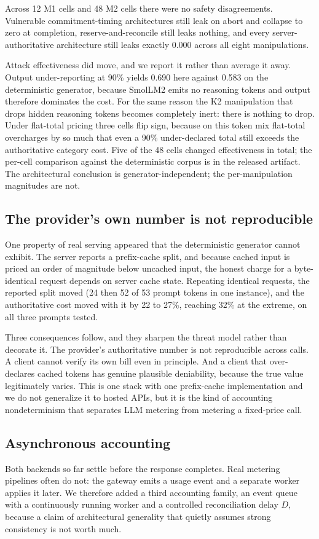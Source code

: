 \documentclass[preprint,3p,authoryear,12pt]{elsarticle}
\begin{document}
Across 12 M1 cells and 48 M2 cells there were no safety disagreements. Vulnerable
commitment-timing architectures still leak on abort and collapse to zero at completion,
reserve-and-reconcile still leaks nothing, and every server-authoritative architecture
still leaks exactly 0.000 across all eight manipulations.

Attack effectiveness did move, and we report it rather than average it away. Output
under-reporting at 90\% yields 0.690 here against 0.583 on the deterministic generator,
because SmolLM2 emits no reasoning tokens and output therefore dominates the cost. For
the same reason the K2 manipulation that drops hidden reasoning tokens becomes completely
inert: there is nothing to drop. Under flat-total pricing three cells flip sign, because
on this token mix flat-total overcharges by so much that even a 90\% under-declared total
still exceeds the authoritative category cost. Five of the 48 cells changed effectiveness
in total; the per-cell comparison against the deterministic corpus is in the released
artifact. The architectural conclusion is generator-independent; the per-manipulation
magnitudes are not.

\subsection{The provider's own number is not reproducible}
One property of real serving appeared that the deterministic generator cannot exhibit.
The server reports a prefix-cache split, and because cached input is priced an order of
magnitude below uncached input, the honest charge for a byte-identical request depends on
server cache state. Repeating identical requests, the reported split moved (24 then 52
of 53 prompt tokens in one instance), and the authoritative cost moved with it by 22 to
27\%, reaching 32\% at the extreme, on all three prompts tested.

Three consequences follow, and they sharpen the threat model rather than decorate it.
The provider's authoritative number is not reproducible across calls. A client cannot
verify its own bill even in principle. And a client that over-declares cached tokens has
genuine plausible deniability, because the true value legitimately varies. This is one
stack with one prefix-cache implementation and we do not generalize it to hosted APIs,
but it is the kind of accounting nondeterminism that separates LLM metering from metering
a fixed-price call.

\subsection{Asynchronous accounting}
\label{sec:async}
Both backends so far settle before the response completes. Real metering pipelines
often do not: the gateway emits a usage event and a separate worker applies it later. We
therefore added a third accounting family, an event queue with a continuously running
worker and a controlled reconciliation delay $D$, because a claim of architectural
generality that quietly assumes strong consistency is not worth much.
\end{document}
